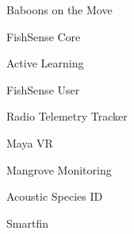 \item Baboons on the Move
\item FishSense Core
\item Active Learning
\item FishSense User
\item Radio Telemetry Tracker
\item Maya VR
\item Mangrove Monitoring
\item Acoustic Species ID
\item Smartfin
